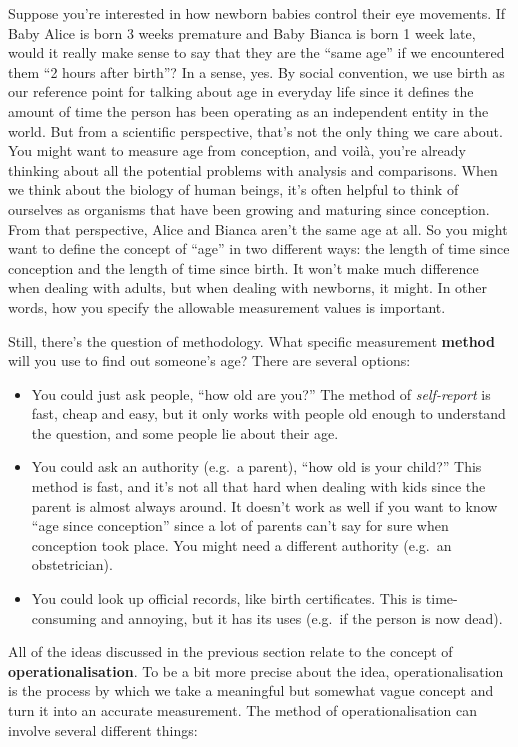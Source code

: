 \documentclass[
  11pt,
]{book}
\providecommand{\tightlist}{%
  \setlength{\itemsep}{0pt}\setlength{\parskip}{0pt}}
\theoremstyle{definition}
\theoremstyle{definition}
\theoremstyle{definition}
\theoremstyle{definition}
\theoremstyle{remark}
\begin{document}
Suppose you're interested in how newborn babies control their eye movements. If Baby Alice is born 3 weeks premature and Baby Bianca is born 1 week late, would it really make sense to say that they are the ``same age'' if we encountered them ``2 hours after birth''? In a sense, yes. By social convention, we use birth as our reference point for talking about age in everyday life since it defines the amount of time the person has been operating as an independent entity in the world. But from a scientific perspective, that's not the only thing we care about. You might want to measure age from conception, and voilà, you're already thinking about all the potential problems with analysis and comparisons. When we think about the biology of human beings, it's often helpful to think of ourselves as organisms that have been growing and maturing since conception. From that perspective, Alice and Bianca aren't the same age at all. So you might want to define the concept of ``age'' in two different ways: the length of time since conception and the length of time since birth. It won't make much difference when dealing with adults, but when dealing with newborns, it might. In other words, how you specify the allowable measurement values is important.

Still, there's the question of methodology. What specific measurement \textbf{method} will you use to find out someone's age? There are several options:

\begin{itemize}
\tightlist
\item
  You could just ask people, ``how old are you?'' The method of \emph{self-report} is fast, cheap and easy, but it only works with people old enough to understand the question, and some people lie about their age.
\item
  You could ask an authority (e.g.~a parent), ``how old is your child?'' This method is fast, and it's not all that hard when dealing with kids since the parent is almost always around. It doesn't work as well if you want to know ``age since conception'' since a lot of parents can't say for sure when conception took place. You might need a different authority (e.g.~an obstetrician).
\item
  You could look up official records, like birth certificates. This is time-consuming and annoying, but it has its uses (e.g.~if the person is now dead).
\end{itemize}

All of the ideas discussed in the previous section relate to the concept of \textbf{operationalisation}. To be a bit more precise about the idea, operationalisation is the process by which we take a meaningful but somewhat vague concept and turn it into an accurate measurement. The method of operationalisation can involve several different things:
\end{document}
